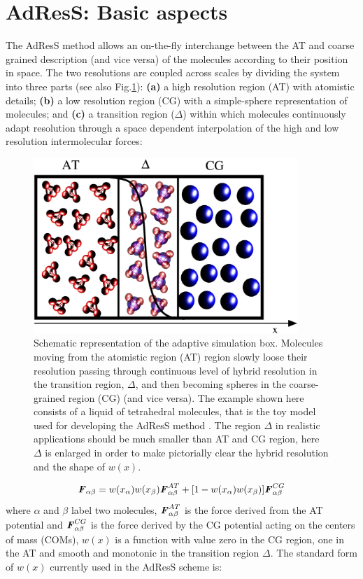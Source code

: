 \documentclass[aps,prb,preprint,citeautoscript]{revtex4}
\renewcommand{\v}[1]{\textbf{\textit{#1}}}
\begin{document}
\section{AdResS: Basic aspects}
The  AdResS method allows an on-the-fly interchange between the AT and coarse grained description (and vice versa) of the molecules according to their position in space. 
The two resolutions are coupled across scales by dividing the system into three parts (see also Fig.\ref{adapt}): {\bf (a)}
a high resolution region (AT) with atomistic details; {\bf (b)} a low resolution region (CG) with a simple-sphere
representation of molecules; and {\bf (c)} a transition region ($\Delta$) within which molecules continuously
adapt resolution through a space dependent interpolation of the high and low resolution intermolecular
forces:
\begin{figure}
  \centering
  \includegraphics[angle=0,width=10cm]{adapt-pic.eps}
  \caption{Schematic representation of the adaptive simulation box. Molecules moving from the atomistic region (AT) region slowly loose their resolution passing through continuous level of hybrid resolution in the transition region, $\Delta$, and then becoming spheres in the coarse-grained region (CG) (and vice versa). The example shown here consists of a liquid of tetrahedral molecules, that is the toy model used for developing the AdResS method \cite{jcp}. The region $\Delta$ in realistic applications should be much smaller than AT and CG region, here $\Delta$ is enlarged in order to make pictorially clear the hybrid resolution and the shape of $w(x)$.}
  \label{adapt}
\end{figure} 
\begin{equation}
{\v F}_{\alpha \beta}=w(x_\alpha)w(x_\beta){\v F}_{\alpha\beta}^{AT}+[1-w(x_\alpha)w(x_\beta)]{\v F}^{CG}_{\alpha\beta}
\label{force}
\end{equation}
where $\alpha$ and $\beta$ label two molecules, ${\v F}_{\alpha\beta}^{AT}$ is the force derived from the AT potential and ${\v F}^{CG}_{\alpha\beta}$ is the force derived by the CG potential acting on the centers of mass (COMs), $w(x)$ is a function with value zero in the CG region, one in the AT and smooth and monotonic in the transition region $\Delta$. The standard form of $w(x)$ currently used in the AdResS scheme is:
\end{document}

